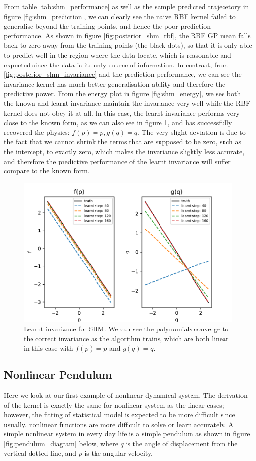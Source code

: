 \documentclass{statsmsc}
\begin{document}
From table \ref{tab:shm_performance} as well as the sample predicted trajecetory in figure \ref{fig:shm_prediction}, we can clearly see the naive RBF kernel failed to generalise beyond the training points, and hence the poor prediction performance. 
As shown in figure \ref{fig:posterior_shm_rbf}, the RBF GP mean falls back to zero away from the training points (the black dots), so that it is only able to predict well in the region where the data locate, which is reasonable and expected since the data is its only source of information. 
In contrast, from \ref{fig:posterior_shm_invariance} and the prediction performance, we can see the invariance kernel has much better generalisation ability and therefore the predictive power.
From the energy plot in figure \ref{fig:shm_energy}, we see both the known and learnt invariance maintain the invariance very well while the RBF kernel does not obey it at all.
In this case, the learnt invariance performs very close to the known form, as we can also see in figure \ref{fig:shm_learnt}, and has successfully recovered the physics: $f(p)=p, g(q)=q$. 
The very slight deviation is due to the fact that we cannot shrink the terms that are supposed to be zero, such as the intercept, to exactly zero, which makes the invariance slightly less accurate, and therefore the predictive performance of the learnt invariance will suffer compare to the known form.

\begin{figure}[H] 
  \includegraphics[width=0.8\linewidth]{../codes/figures/shm_learnt_over_time.pdf}
  \centering
  \caption{Learnt invariance for SHM. We can see the polynomials converge to the correct invariance as the algorithm trains, which are both linear in this case with $f(p)=p$ and $g(q)=q$.}
  \label{fig:shm_learnt}
\end{figure}


\subsection{Nonlinear Pendulum}
Here we look at our first example of nonlinear dynamical system.
The derivation of the kernel is exactly the same for nonlinear system as the linear cases; 
however, the fitting of statistical model is expected to be more difficult since usually, nonlinear functions are more difficult to solve or learn accurately.
A simple nonlinear system in every day life is a simple pendulum as shown in figure \ref{fig:pendulum_diagram} below, where $q$ is the angle of displacement from the vertical dotted line, and $p$ is the angular velocity.
\end{document}
